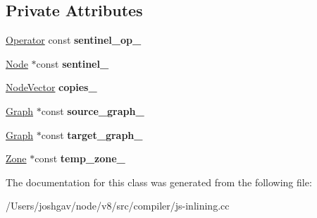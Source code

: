 \subsection*{Private Attributes}
\begin{DoxyCompactItemize}
\item 
\hyperlink{classv8_1_1internal_1_1compiler_1_1_operator}{Operator} const {\bfseries sentinel\+\_\+op\+\_\+}\hypertarget{classv8_1_1internal_1_1compiler_1_1_copy_visitor_a61202a2da1282f9c80e4371af646f342}{}\label{classv8_1_1internal_1_1compiler_1_1_copy_visitor_a61202a2da1282f9c80e4371af646f342}

\item 
\hyperlink{classv8_1_1internal_1_1compiler_1_1_node}{Node} $\ast$const {\bfseries sentinel\+\_\+}\hypertarget{classv8_1_1internal_1_1compiler_1_1_copy_visitor_aed8948f48e49dd424c201b4786a83cf3}{}\label{classv8_1_1internal_1_1compiler_1_1_copy_visitor_aed8948f48e49dd424c201b4786a83cf3}

\item 
\hyperlink{classv8_1_1internal_1_1_zone_vector}{Node\+Vector} {\bfseries copies\+\_\+}\hypertarget{classv8_1_1internal_1_1compiler_1_1_copy_visitor_a577a76ed7782fd7cee47c5ee1805d730}{}\label{classv8_1_1internal_1_1compiler_1_1_copy_visitor_a577a76ed7782fd7cee47c5ee1805d730}

\item 
\hyperlink{classv8_1_1internal_1_1compiler_1_1_graph}{Graph} $\ast$const {\bfseries source\+\_\+graph\+\_\+}\hypertarget{classv8_1_1internal_1_1compiler_1_1_copy_visitor_a84fef5039d1e149600c42e59eed386bf}{}\label{classv8_1_1internal_1_1compiler_1_1_copy_visitor_a84fef5039d1e149600c42e59eed386bf}

\item 
\hyperlink{classv8_1_1internal_1_1compiler_1_1_graph}{Graph} $\ast$const {\bfseries target\+\_\+graph\+\_\+}\hypertarget{classv8_1_1internal_1_1compiler_1_1_copy_visitor_a4179f8549965f9de89788c126689a461}{}\label{classv8_1_1internal_1_1compiler_1_1_copy_visitor_a4179f8549965f9de89788c126689a461}

\item 
\hyperlink{classv8_1_1internal_1_1_zone}{Zone} $\ast$const {\bfseries temp\+\_\+zone\+\_\+}\hypertarget{classv8_1_1internal_1_1compiler_1_1_copy_visitor_a0565a5ca9613e251d1c043b8d57d1d07}{}\label{classv8_1_1internal_1_1compiler_1_1_copy_visitor_a0565a5ca9613e251d1c043b8d57d1d07}

\end{DoxyCompactItemize}


The documentation for this class was generated from the following file\+:\begin{DoxyCompactItemize}
\item 
/\+Users/joshgav/node/v8/src/compiler/js-\/inlining.\+cc\end{DoxyCompactItemize}
